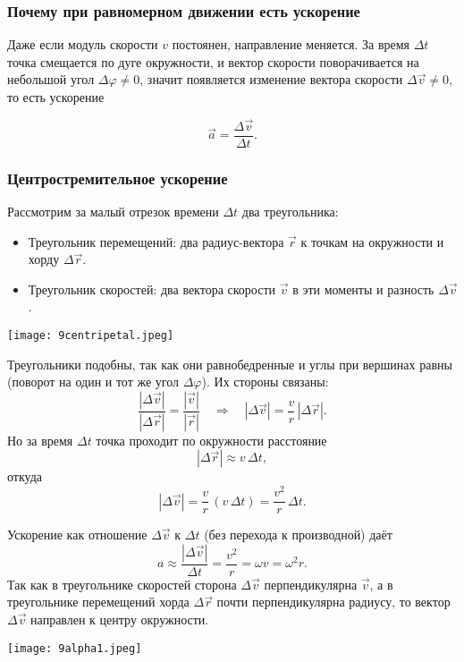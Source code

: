 \documentclass[12pt, a4paper]{article}%
\begin{document}
\subsubsection*{Почему при равномерном движении есть ускорение}
Даже если модуль скорости $v$ постоянен, направление меняется. За время $\Delta t$ точка смещается по дуге окружности, и вектор скорости поворачивается на небольшой угол $\Delta\varphi\neq0$, значит появляется изменение вектора скорости $\Delta\vec v\neq0$, то есть ускорение

\[
\vec a = \frac{\Delta\vec v}{\Delta t}.
\]

\subsubsection*{Центростремительное ускорение}
Рассмотрим за малый отрезок времени $\Delta t$ два треугольника:
\begin{itemize}
  \item Треугольник перемещений: два радиус-вектора $\vec r$ к точкам на окружности и хорду $\Delta\vec r$.
  \item Треугольник скоростей: два вектора скорости $\vec v$ в эти моменты и разность $\Delta\vec v$.
\end{itemize}



\begin{center}
\texttt{[image: 9centripetal.jpeg]}
\label{fig:mpr}
\end{center}


Треугольники подобны, так как они равнобедренные и углы при вершинах равны (поворот на один и тот же угол $\Delta\varphi$). Их стороны связаны:
\[
\frac{|\Delta\vec v|}{|\Delta\vec r|}
= \frac{|\vec v|}{|\vec r|}
\quad\Longrightarrow\quad
|\Delta\vec v| = \frac{v}{r}\,|\Delta\vec r|.
\]
Но за время $\Delta t$ точка проходит по окружности расстояние
\[
|\Delta\vec r| \approx v\,\Delta t,
\]
откуда
\[
|\Delta\vec v| = \frac{v}{r}\,(v\,\Delta t) = \frac{v^2}{r}\,\Delta t.
\]

Ускорение как отношение $\Delta\vec v$ к $\Delta t$ (без перехода к производной) даёт
\[
a \approx \frac{|\Delta\vec v|}{\Delta t} = \frac{v^2}{r} = \omega v = \omega^2 r.
\]
Так как в треугольнике скоростей сторона $\Delta\vec v$ перпендикулярна $\vec v$, а в
треугольнике перемещений хорда $\Delta\vec r$ почти перпендикулярна радиусу, то вектор 
$\Delta\vec v$ направлен к центру окружности. 


\begin{center}
\texttt{[image: 9alpha1.jpeg]}
\label{fig:mpr}
\end{center}
\end{document}
